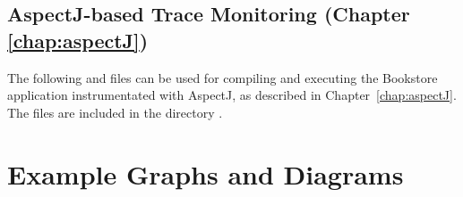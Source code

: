     \subsection{AspectJ-based Trace Monitoring (Chapter \ref{chap:aspectJ})}
      The following  and  files can be used for compiling and executing the Bookstore application instrumentated with AspectJ, as described in Chapter~\ref{chap:aspectJ}. %
The files are included in the directory \file{\aspectJBookstoreApplicationDirDistro{}/}.
      \setXMLListing
      
           

\newpage
  \section{Example Graphs and Diagrams}
